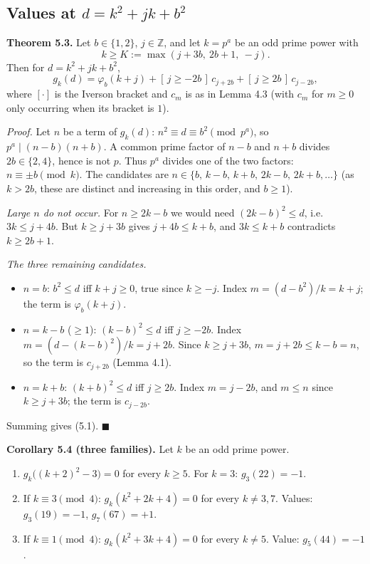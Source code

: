 \subsection{\texorpdfstring{Values at \(d=k^2+jk+b^2\)}{Values at d=k\^{}2+jk+b\^{}2}}\label{values-at-dk2jkb2}

\textbf{Theorem 5.3.} Let \(b\in\{1,2\}\), \(j\in\mathbb{Z}\), and let \(k=p^a\) be an odd prime power with
\[k\ge K:=\max(j+3b,\ 2b+1,\ -j).\]
Then for \(d=k^2+jk+b^2\),
\[g_k(d)=\varphi_b(k+j)+[\,j\ge-2b\,]\,c_{j+2b}+[\,j\ge2b\,]\,c_{j-2b},\tag{5.1}\]
where \([\cdot]\) is the Iverson bracket and \(c_m\) is as in Lemma 4.3 (with \(c_m\) for \(m\ge0\) only occurring when its bracket is \(1\)).

\emph{Proof.} Let \(n\) be a term of \(g_k(d)\): \(n^2\equiv d\equiv b^2\pmod{p^a}\), so \(p^a\mid(n-b)(n+b)\). A common prime factor of \(n-b\) and \(n+b\) divides \(2b\in\{2,4\}\), hence is not \(p\). Thus \(p^a\) divides one of the two factors: \(n\equiv\pm b\pmod k\). The candidates are \(n\in\{b,\,k-b,\,k+b,\,2k-b,\,2k+b,\dots\}\) (as \(k>2b\), these are distinct and increasing in this order, and \(b\ge1\)).

\emph{Large \(n\) do not occur.} For \(n\ge2k-b\) we would need \((2k-b)^2\le d\), i.e.~\(3k\le j+4b\). But \(k\ge j+3b\) gives \(j+4b\le k+b\), and \(3k\le k+b\) contradicts \(k\ge2b+1\).

\emph{The three remaining candidates.}

\begin{itemize}
\tightlist
\item
  \(n=b\): \(b^2\le d\) iff \(k+j\ge0\), true since \(k\ge-j\). Index \(m=(d-b^2)/k=k+j\); the term is \(\varphi_b(k+j)\).
\item
  \(n=k-b\) (\(\ge1\)): \((k-b)^2\le d\) iff \(j\ge-2b\). Index \(m=(d-(k-b)^2)/k=j+2b\). Since \(k\ge j+3b\), \(m=j+2b\le k-b=n\), so the term is \(c_{j+2b}\) (Lemma 4.1).
\item
  \(n=k+b\): \((k+b)^2\le d\) iff \(j\ge2b\). Index \(m=j-2b\), and \(m\le n\) since \(k\ge j+3b\); the term is \(c_{j-2b}\).
\end{itemize}

Summing gives (5.1). \(\blacksquare\)

\textbf{Corollary 5.4 (three families).} Let \(k\) be an odd prime power.

\begin{enumerate}
\def\labelenumi{\arabic{enumi}.}
\tightlist
\item
  \(g_k\bigl((k+2)^2-3\bigr)=0\) for every \(k\ge5\). For \(k=3\): \(g_3(22)=-1\).
\item
  If \(k\equiv3\pmod 4\): \(g_k(k^2+2k+4)=0\) for every \(k\ne3,7\). Values: \(g_3(19)=-1\), \(g_7(67)=+1\).
\item
  If \(k\equiv1\pmod 4\): \(g_k(k^2+3k+4)=0\) for every \(k\ne5\). Value: \(g_5(44)=-1\).
\end{enumerate}

